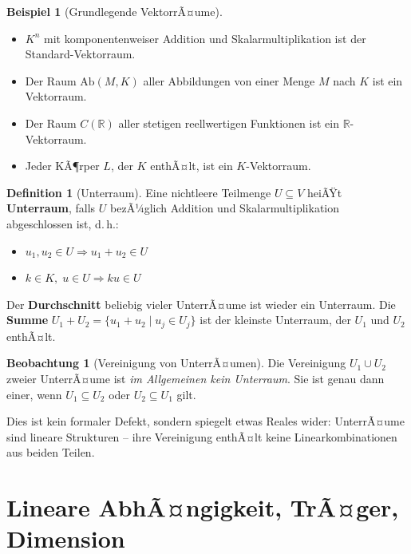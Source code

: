 ﻿\documentclass[a4paper,12pt]{report}
\theoremstyle{definition}
\newtheorem{definition}{Definition}
\newtheorem{beispiel}{Beispiel}
\newtheorem{beobachtung}{Beobachtung}
\begin{document}
\begin{beispiel}[Grundlegende VektorrÃ¤ume]
    \begin{itemize}
        \item[-] $K^n$ mit komponentenweiser Addition und Skalarmultiplikation
              ist der Standard-Vektorraum.
        \item[-] Der Raum $\mathrm{Ab}(M, K)$ aller Abbildungen von einer
              Menge $M$ nach $K$ ist ein Vektorraum.
        \item[-] Der Raum $C(\mathbb{R})$ aller stetigen reellwertigen Funktionen
              ist ein $\mathbb{R}$-Vektorraum.
        \item[-] Jeder KÃ¶rper $L$, der $K$ enthÃ¤lt, ist ein $K$-Vektorraum.
    \end{itemize}
\end{beispiel}

\begin{definition}[Unterraum]
    Eine nichtleere Teilmenge $U \subseteq V$ heiÃŸt \textbf{Unterraum}, falls
    $U$ bezÃ¼glich Addition und Skalarmultiplikation abgeschlossen ist, d.\,h.:
    \begin{itemize}
        \item[-] $u_1, u_2 \in U \Rightarrow u_1 + u_2 \in U$
        \item[-] $k \in K,\; u \in U \Rightarrow ku \in U$
    \end{itemize}
    Der \textbf{Durchschnitt} beliebig vieler UnterrÃ¤ume ist wieder ein
    Unterraum. Die \textbf{Summe} $U_1 + U_2 = \{u_1 + u_2 \mid u_j \in U_j\}$
    ist der kleinste Unterraum, der $U_1$ und $U_2$ enthÃ¤lt.
\end{definition}

\begin{beobachtung}[Vereinigung von UnterrÃ¤umen]
    Die Vereinigung $U_1 \cup U_2$ zweier UnterrÃ¤ume ist \emph{im Allgemeinen
    kein Unterraum}. Sie ist genau dann einer, wenn $U_1 \subseteq U_2$ oder
    $U_2 \subseteq U_1$ gilt.

    Dies ist kein formaler Defekt, sondern spiegelt etwas Reales wider:
    UnterrÃ¤ume sind lineare Strukturen -- ihre Vereinigung enthÃ¤lt keine
    Linearkombinationen aus beiden Teilen.
\end{beobachtung}

\section{Lineare AbhÃ¤ngigkeit, TrÃ¤ger, Dimension}
\end{document}
